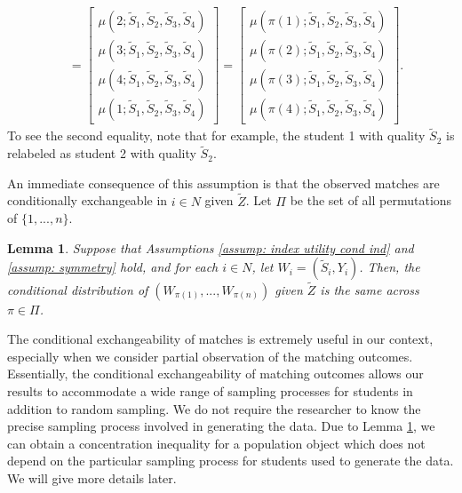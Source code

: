 \documentclass[12pt, fullpage]{amsart}
\newtheorem{lemma}{Lemma}[section]
\theoremstyle{definition}
\theoremstyle{definition}
\theoremstyle{definition}
\begin{document}
\begin{bibunit}[econometrica]
\begin{align*}
	&= \begin{bmatrix}
		\mu(2;\tilde S_{1},\tilde S_{2},\tilde S_{3},\tilde S_{4}) \\
		\mu(3;\tilde S_{1},\tilde S_{2},\tilde S_{3},\tilde S_{4}) \\
		\mu(4;\tilde S_{1},\tilde S_{2},\tilde S_{3},\tilde S_{4}) \\
		\mu(1;\tilde S_{1},\tilde S_{2},\tilde S_{3},\tilde S_{4})
	\end{bmatrix}
	= \begin{bmatrix}
		\mu(\pi(1);\tilde S_{1},\tilde S_{2},\tilde S_{3},\tilde S_{4}) \\
		\mu(\pi(2);\tilde S_{1},\tilde S_{2},\tilde S_{3},\tilde S_{4}) \\
		\mu(\pi(3);\tilde S_{1},\tilde S_{2},\tilde S_{3},\tilde S_{4}) \\
		\mu(\pi(4);\tilde S_{1},\tilde S_{2},\tilde S_{3},\tilde S_{4})
	\end{bmatrix}
.
\end{align*}
To see the second equality, note that for example, the student 1 with quality $\tilde S_2$ is relabeled as student 2 with quality $\tilde S_2$. 

An immediate consequence of this assumption is that the observed matches are conditionally exchangeable in $i \in N$ given $\tilde Z$. Let $\Pi$ be the set of all permutations of $\{1,...,n\}$.

 \begin{lemma}
	\label{lemm: exch}
	Suppose that Assumptions \ref{assump: index utility cond ind} and \ref{assump: symmetry} hold, and for each $i \in N$, let $W_i = (\tilde S_{i},Y_i)$. Then, the conditional distribution of $(W_{\pi(1)},...,W_{\pi(n)})$ given $\tilde Z$ is the same across $\pi \in \Pi$.
\end{lemma}

The conditional exchangeability of matches is extremely useful in our context, especially when we consider partial observation of the matching outcomes. Essentially, the conditional exchangeability of matching outcomes allows our results to accommodate a wide range of sampling processes for students in addition to random sampling. We do not require the researcher to know the precise sampling process involved in generating the data. Due to Lemma \ref{lemm: exch}, we can obtain a concentration inequality for a population object which does not depend on the particular sampling process for students used to generate the data. We will give more details later.


\end{bibunit}
\end{document}
